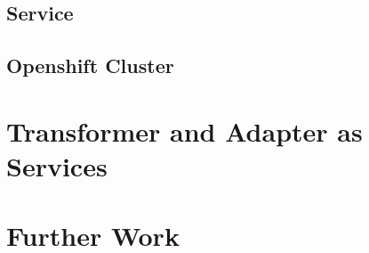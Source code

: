 \subsection{Service}
\label{sec:esbd-resources-service}

\subsection{Openshift Cluster}
\label{sec:esbd-resources-openshift}

\section{Transformer and Adapter as Services}
\label{sec:esbd-service-tranformer-adapter}

\section{Further Work}
\label{sec:esbd-furhter-work}
